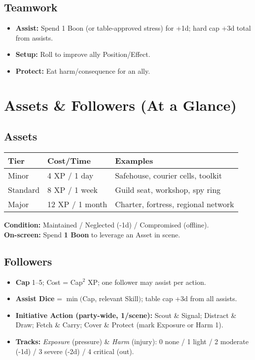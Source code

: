 \begin{multicols}{2}
\subsection*{Teamwork}
\begin{itemize}
  \item \textbf{Assist:} Spend 1 Boon (or table-approved stress) for +1d; hard cap +3d total from assists.
  \item \textbf{Setup:} Roll to improve ally Position/Effect.
  \item \textbf{Protect:} Eat harm/consequence for an ally.
\end{itemize}

\section{Assets \& Followers (At a Glance)}

\subsection*{Assets}
\begin{center}
\begin{tabular}{llp{5.9cm}}
\toprule
\textbf{Tier} & \textbf{Cost/Time} & \textbf{Examples} \\
\midrule
Minor & 4 XP / 1 day & Safehouse, courier cells, toolkit \\
Standard & 8 XP / 1 week & Guild seat, workshop, spy ring \\
Major & 12 XP / 1 month & Charter, fortress, regional network \\
\bottomrule
\end{tabular}
\end{center}
\textbf{Condition:} Maintained / Neglected (-1d) / Compromised (offline).\\
\textbf{On-screen:} Spend \textbf{1 Boon} to leverage an Asset in scene.

\subsection*{Followers}
\begin{itemize}
  \item \textbf{Cap} 1–5; Cost = Cap$^{2}$ XP; one follower may assist per action.
  \item \textbf{Assist Dice} = \(\min(\)Cap, relevant Skill\()\); table cap +3d from all assists.
  \item \textbf{Initiative Action (party-wide, 1/scene):} Scout \& Signal; Distract \& Draw; Fetch \& Carry; Cover \& Protect (mark Exposure or Harm 1).
  \item \textbf{Tracks:} \emph{Exposure} (pressure) \& \emph{Harm} (injury): 0 none / 1 light / 2 moderate (-1d) / 3 severe (-2d) / 4 critical (out).
\end{itemize}


\end{multicols}

